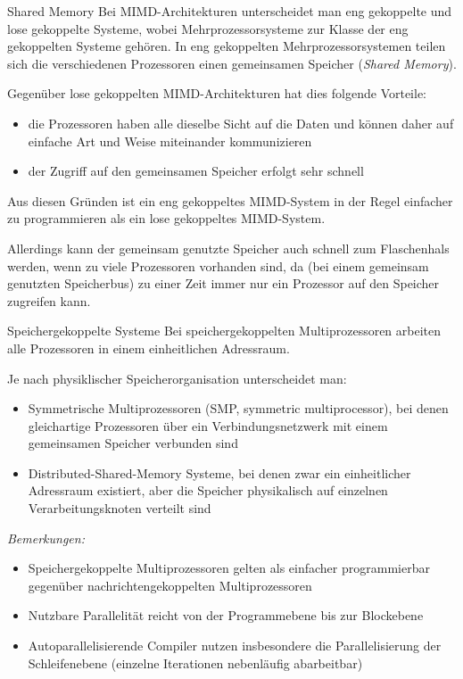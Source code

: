 \begin{defi}{Shared Memory}
    Bei MIMD-Architekturen unterscheidet man eng gekoppelte und lose gekoppelte Systeme, wobei Mehrprozessorsysteme zur Klasse der eng gekoppelten Systeme gehören.
    In eng gekoppelten Mehrprozessorsystemen teilen sich die verschiedenen Prozessoren einen gemeinsamen Speicher (\emph{Shared Memory}).

    Gegenüber lose gekoppelten MIMD-Architekturen hat dies folgende Vorteile:
    \begin{itemize}
        \item die Prozessoren haben alle dieselbe Sicht auf die Daten und können daher auf einfache Art und Weise miteinander kommunizieren
        \item der Zugriff auf den gemeinsamen Speicher erfolgt sehr schnell
    \end{itemize}

    Aus diesen Gründen ist ein eng gekoppeltes MIMD-System in der Regel einfacher zu programmieren als ein lose gekoppeltes MIMD-System.

    Allerdings kann der gemeinsam genutzte Speicher auch schnell zum Flaschenhals werden, wenn zu viele Prozessoren vorhanden sind, da (bei einem gemeinsam genutzten Speicherbus) zu einer Zeit immer nur ein Prozessor auf den Speicher zugreifen kann.
    \begin{defi}{Speichergekoppelte Systeme}
        Bei speichergekoppelten Multiprozessoren arbeiten alle Prozessoren in einem einheitlichen Adressraum.

        Je nach physiklischer Speicherorganisation unterscheidet man:
        \begin{itemize}
            \item Symmetrische Multiprozessoren (SMP, symmetric multiprocessor),
            bei denen gleichartige Prozessoren über ein Verbindungsnetzwerk mit einem gemeinsamen Speicher verbunden sind
            \item Distributed-Shared-Memory Systeme,
            bei denen zwar ein einheitlicher Adressraum existiert,
            aber die Speicher physikalisch auf einzelnen Verarbeitungsknoten verteilt sind
        \end{itemize}

        \emph{Bemerkungen:}
        \begin{itemize}
            \item Speichergekoppelte Multiprozessoren gelten als einfacher programmierbar gegenüber nachrichtengekoppelten Multiprozessoren
            \item Nutzbare Parallelität reicht von der Programmebene bis zur Blockebene
            \item Autoparallelisierende Compiler nutzen insbesondere die Parallelisierung der Schleifenebene (einzelne Iterationen nebenläufig abarbeitbar)
        \end{itemize}
    \end{defi}


\end{defi}
